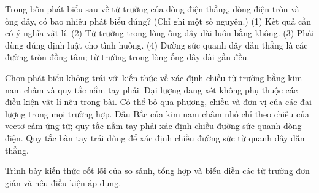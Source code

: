 \begin{ex}
Trong bốn phát biểu sau về từ trường của dòng điện thẳng, dòng điện tròn và ống dây, có bao nhiêu phát biểu đúng? (Chỉ ghi một số nguyên.) (1) Kết quả cần có ý nghĩa vật lí. (2) Từ trường trong lòng ống dây dài luôn bằng không. (3) Phải dùng đúng định luật cho tình huống. (4) Đường sức quanh dây dẫn thẳng là các đường tròn đồng tâm; từ trường trong lòng ống dây dài gần đều.
\end{ex}

\begin{ex}
Chọn phát biểu không trái với kiến thức về xác định chiều từ trường bằng kim nam châm và quy tắc nắm tay phải.
\choice
{Đại lượng đang xét không phụ thuộc các điều kiện vật lí nêu trong bài.}
{Có thể bỏ qua phương, chiều và đơn vị của các đại lượng trong mọi trường hợp.}
{\True Đầu Bắc của kim nam châm nhỏ chỉ theo chiều của vectơ cảm ứng từ; quy tắc nắm tay phải xác định chiều đường sức quanh dòng điện.}
{Quy tắc bàn tay trái dùng để xác định chiều đường sức từ quanh dây dẫn thẳng.}
\end{ex}

\begin{bt}
Trình bày kiến thức cốt lõi của so sánh, tổng hợp và biểu diễn các từ trường đơn giản và nêu điều kiện áp dụng.
\end{bt}

